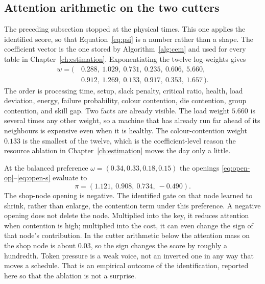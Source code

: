 \subsection{Attention arithmetic on the two cutters}

The preceding subsection stopped at the physical times. This one applies the identified score, so that Equation~\eqref{eq:psi} is a number rather than a shape. The coefficient vector is the one stored by Algorithm~\ref{alg:cem} and used for every table in Chapter~\ref{ch:estimation}. Exponentiating the twelve log-weights gives
\begin{equation}
\begin{aligned}
w = (\, &0.288,\ 1.029,\ 0.731,\ 0.235,\ 0.606,\ 5.660,\\
&0.912,\ 1.269,\ 0.133,\ 0.917,\ 0.353,\ 1.657 \,).
\end{aligned}
\label{eq:wstar}
\end{equation}
The order is processing time, setup, slack penalty, critical ratio, health, load deviation, energy, failure probability, colour contention, die contention, group contention, and skill gap. Two facts are already visible. The load weight \(5.660\) is several times any other weight, so a machine that has already run far ahead of its neighbours is expensive even when it is healthy. The colour-contention weight \(0.133\) is the smallest of the twelve, which is the coefficient-level reason the resource ablation in Chapter~\ref{ch:estimation} moves the day only a little.

At the balanced preference \(\omega = (0.34, 0.33, 0.18, 0.15)\) the openings \eqref{eq:open-op}--\eqref{eq:open-s} evaluate to
\begin{equation}
\pi = (1.121,\ 0.908,\ 0.734,\ -0.490).
\label{eq:pi-num}
\end{equation}
The shop-node opening is negative. The identified gate on that node learned to shrink, rather than enlarge, the contention term under this preference. A negative opening does not delete the node. Multiplied into the key, it reduces attention when contention is high; multiplied into the cost, it can even change the sign of that node's contribution. In the cutter arithmetic below the attention mass on the shop node is about \(0.03\), so the sign changes the score by roughly a hundredth. Token pressure is a weak voice, not an inverted one in any way that moves a schedule. That is an empirical outcome of the identification, reported here so that the ablation is not a surprise.

